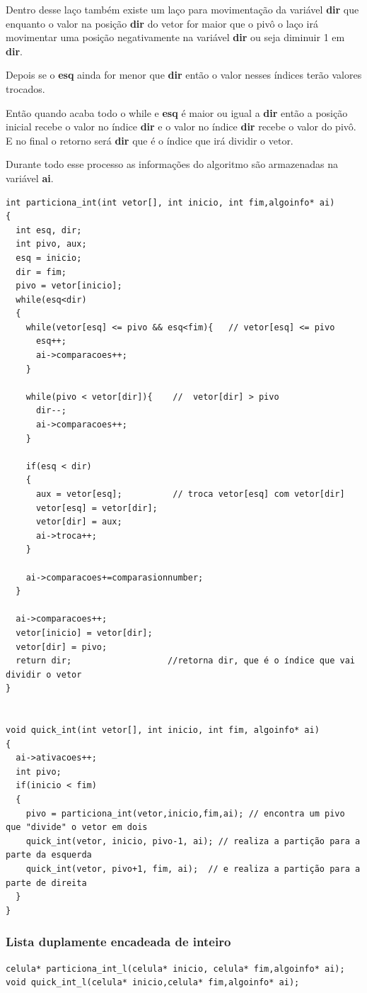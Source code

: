 \documentclass[11pt]{article}
\begin{document}
Dentro desse laço também existe um laço para movimentação da variável \textbf{dir} que enquanto o valor na posição \textbf{dir} do vetor for maior que o pivô o laço irá movimentar uma posição negativamente na variável \textbf{dir} ou seja diminuir 1 em \textbf{dir}.

Depois se o \textbf{esq} ainda for menor que \textbf{dir} então o valor nesses índices terão valores trocados.

Então quando acaba todo o while e \textbf{esq} é maior ou igual a \textbf{dir} então a posição inicial recebe o valor no índice \textbf{dir} e o valor no índice \textbf{dir} recebe o valor do pivô. E no final o retorno será \textbf{dir} que é o índice que irá dividir o vetor.

Durante todo esse processo as informações do algoritmo são armazenadas na variável \textbf{ai}.
\begin{verbatim}
int particiona_int(int vetor[], int inicio, int fim,algoinfo* ai)
{
  int esq, dir;
  int pivo, aux;
  esq = inicio;
  dir = fim;
  pivo = vetor[inicio];
  while(esq<dir)
  {
    while(vetor[esq] <= pivo && esq<fim){   // vetor[esq] <= pivo
      esq++;
      ai->comparacoes++;
    }

    while(pivo < vetor[dir]){    //  vetor[dir] > pivo
      dir--;
      ai->comparacoes++;
    }

    if(esq < dir)
    {
      aux = vetor[esq];          // troca vetor[esq] com vetor[dir]
      vetor[esq] = vetor[dir];
      vetor[dir] = aux;
      ai->troca++;
    }

    ai->comparacoes+=comparasionnumber;
  }

  ai->comparacoes++;
  vetor[inicio] = vetor[dir];
  vetor[dir] = pivo;
  return dir;                   //retorna dir, que é o índice que vai dividir o vetor
}


void quick_int(int vetor[], int inicio, int fim, algoinfo* ai)
{
  ai->ativacoes++;
  int pivo;
  if(inicio < fim)
  {
    pivo = particiona_int(vetor,inicio,fim,ai); // encontra um pivo que "divide" o vetor em dois
    quick_int(vetor, inicio, pivo-1, ai); // realiza a partição para a parte da esquerda
    quick_int(vetor, pivo+1, fim, ai);  // e realiza a partição para a parte de direita
  }
}
\end{verbatim}
\subsubsection{Lista duplamente encadeada de inteiro}
\label{sec:orgf7e7a89}
\begin{verbatim}
celula* particiona_int_l(celula* inicio, celula* fim,algoinfo* ai);
void quick_int_l(celula* inicio,celula* fim,algoinfo* ai);
\end{verbatim}
\end{document}
